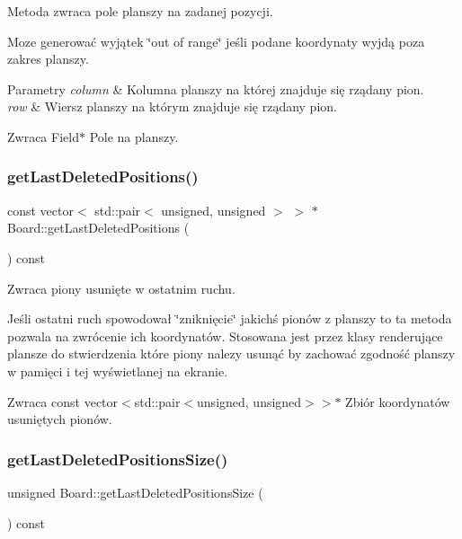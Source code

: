 Metoda zwraca pole planszy na zadanej pozycji. 

Moze generować wyjątek \char`\"{}out of range\char`\"{} jeśli podane koordynaty wyjdą poza zakres planszy. 
\begin{DoxyParams}{Parametry}
{\em column} & Kolumna planszy na której znajduje się rządany pion. \\
\hline
{\em row} & Wiersz planszy na którym znajduje się rządany pion. \\
\hline
\end{DoxyParams}
\begin{DoxyReturn}{Zwraca}
Field$\ast$ Pole na planszy. 
\end{DoxyReturn}
\mbox{\label{class_board_a96f7b5eed13ad35371ba5f560b5bc830}} 
\subsubsection{getLastDeletedPositions()}
{\footnotesize\ttfamily const vector$<$ std\+::pair$<$ unsigned, unsigned $>$ $>$ $\ast$ Board\+::get\+Last\+Deleted\+Positions (\begin{DoxyParamCaption}{ }\end{DoxyParamCaption}) const}



Zwraca piony usunięte w ostatnim ruchu. 

Jeśli ostatni ruch spowodował \char`\"{}zniknięcie\char`\"{} jakichś pionów z planszy to ta metoda pozwala na zwrócenie ich koordynatów. Stosowana jest przez klasy renderujące plansze do stwierdzenia które piony nalezy usunąć by zachować zgodność planszy w pamięci i tej wyświetlanej na ekranie. \begin{DoxyReturn}{Zwraca}
const vector$<$std\+::pair$<$unsigned, unsigned$>$$>$$\ast$ Zbiór koordynatów usuniętych pionów. 
\end{DoxyReturn}
\mbox{\label{class_board_ac6c603061e62f06db47054cd258d57ae}} 
\subsubsection{getLastDeletedPositionsSize()}
{\footnotesize\ttfamily unsigned Board\+::get\+Last\+Deleted\+Positions\+Size (\begin{DoxyParamCaption}{ }\end{DoxyParamCaption}) const}



